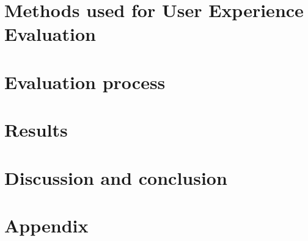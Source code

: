 \documentclass[fleqn]{IOS-Book-Article}
\begin{document}


\section{Methods used for User Experience Evaluation} \label{sec:experiments}



\section{Evaluation process}


\section{Results} \label{sec:results}



\section{Discussion and conclusion} \label{sec:conclusion}


\newpage

\section{Appendix}

\end{document}
